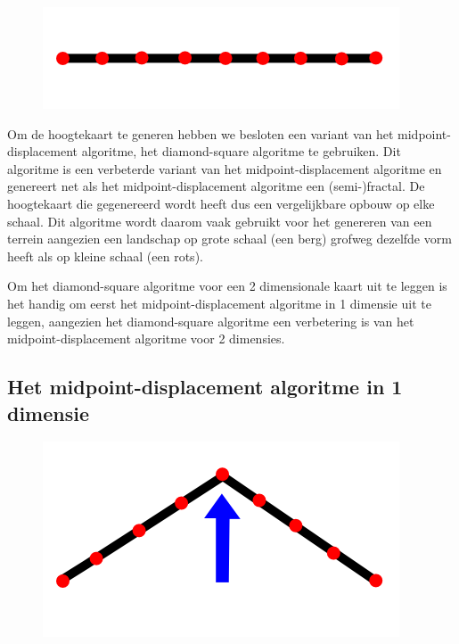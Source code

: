 \documentclass{article}
\begin{document}
\begin{figure}
  \includegraphics[width=0.9\linewidth]{hoogtekaart-line.png}
  \caption{\cite{hoogtekaart-illustratie}}
  \label{fig:hoogtekaart-line}
\end{figure}

Om de hoogtekaart te generen hebben we besloten een variant van het midpoint-displacement algoritme, het diamond-square algoritme te gebruiken. Dit algoritme is een verbeterde variant van het midpoint-displacement algoritme en genereert net als het midpoint-displacement algoritme een (semi-)fractal. De hoogtekaart die gegenereerd wordt heeft dus een vergelijkbare opbouw op elke schaal. Dit algoritme wordt daarom vaak gebruikt voor het genereren van een terrein aangezien een landschap op grote schaal (een berg) grofweg dezelfde vorm heeft als op kleine schaal (een rots).

Om het diamond-square algoritme voor een 2 dimensionale kaart uit te leggen is het handig om eerst het midpoint-displacement algoritme in 1 dimensie uit te leggen, aangezien het diamond-square algoritme een verbetering is van het midpoint-displacement algoritme voor 2 dimensies.

\subsection{Het midpoint-displacement algoritme in 1 dimensie}

\begin{figure}
  \includegraphics[width=0.9\linewidth]{hoogtekaart-midpoint.png}
  \caption{\cite{hoogtekaart-illustratie}}
  \label{fig:hoogtekaart-midpoint}
\end{figure}
\end{document}
